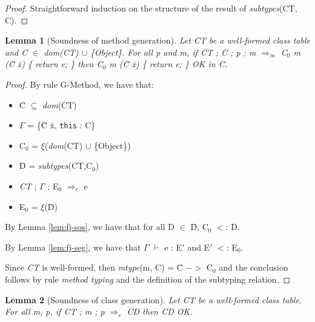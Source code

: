\documentclass[tese,capa,english]{texufpel}
\newtheorem{lemma}{Lemma}
\begin{document}
\begin{proof}
Straightforward induction on the structure of the result of \emph{subtypes}(CT, C).
\end{proof}

\begin{lemma}[Soundness of method generation]
\label{lem:fj-smg}
Let \emph{CT} be a well-formed class table and C $\in$ dom\emph{(CT)} $\cup$ \emph{\{Object\}}.
For all p and m, if \emph{CT} ; C ; p ; m $\Rightarrow_m$ \emph{C$_0$ m (\={C} \={x}) \{ \textnormal{return} e; \}} then \emph{C$_0$ m (\={C} \={x}) \{ \textnormal{return} e; \}} OK in C.
\end{lemma}

\begin{proof}
By rule {\footnotesize G-Method}, we have that:
\begin{itemize}
\item \={C} $\subseteq$ \emph{dom}(CT)
\item $\Gamma$ = \{\={C} \={x}, \texttt{this} : C\}
\item C$_0$ = $\xi$(\emph{dom}(CT) $\cup$ \{Object\})
\item \={D} = \emph{subtypes}(CT,C$_0$)
\item \emph{CT} ; $\Gamma$ ; E$_0$ $\Rightarrow_e$ e
\item E$_0$ = $\xi$(\={D})
\end{itemize}

By Lemma \ref{lem:fj-sos}, we have that for all D $\in$ \={D}, C$_0$ $<$: D.

By Lemma \ref{lem:fj-seg}, we have that $\Gamma$ $\vdash$ e : E$'$ and E$'$ $<$: E$_0$.

Since \emph{CT} is well-formed, then \emph{mtype}(m, C) = \={C} $->$ C$_0$ and the conclusion follows by rule \emph{method typing} and the definition of the subtyping relation.
\end{proof}

\begin{lemma}[Soundness of class generation]
\label{lem:fj-scg}
Let \emph{CT} be a well-formed class table. For all m, p, if \emph{CT} ; m ; p $\Rightarrow_c$ CD then CD OK.
\end{lemma}
\end{document}
